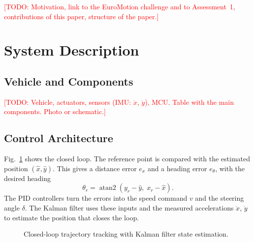 \documentclass[conference]{IEEEtran}
\newcommand{\todo}[1]{\textcolor{red}{[TODO: #1]}}
\begin{document}
\todo{Motivation, link to the EuroMotion challenge and to Assessment~1,
contributions of this paper, structure of the paper.}

\section{System Description}

\subsection{Vehicle and Components}
\todo{Vehicle, actuators, sensors (IMU: $\ddot{x}$, $\ddot{y}$), MCU.
Table with the main components. Photo or schematic.}

\subsection{Control Architecture}
Fig.~\ref{fig:loop} shows the closed loop. The reference point is
compared with the estimated position $(\hat{x}, \hat{y})$. This gives a
distance error $e_x$ and a heading error $e_\theta$, with the desired
heading
\begin{equation}
  \theta_r = \operatorname{atan2}(y_r - \hat{y},\; x_r - \hat{x}).
  \label{eq:heading}
\end{equation}
The PID controllers turn the errors into the speed command $v$ and the
steering angle $\delta$. The Kalman filter uses these inputs and the
measured accelerations $\ddot{x}$, $\ddot{y}$ to estimate the position
that closes the loop.

\begin{figure}[t]
\centering
{}
\caption{Closed-loop trajectory tracking with Kalman filter state
estimation.}
\label{fig:loop}
\end{figure}
\end{document}
